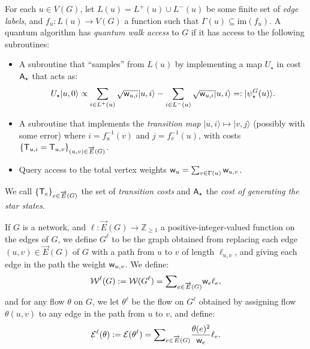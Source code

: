\documentclass{article}
\def\ket#1{{\lvert}#1\rangle}
\renewcommand{\>}{\rangle}
\newcommand{\<}{\langle}
\renewcommand{\(}{\left(}
\renewcommand{\)}{\right)}
\def\w{{\sf w}}
\begin{document}
\begin{definition}\label{def:QW-access}
For each $u\in V(G)$, let $L(u)=L^+(u)\cup L^-(u)$ be some finite set of \emph{edge labels}, and $f_u:L(u)\rightarrow V(G)$ a function such that $\Gamma(u)\subseteq \mathrm{im}(f_u)$. 
A quantum algorithm has \emph{quantum walk access} to $G$ if it has access to the following subroutines:
\begin{itemize}
\item A subroutine that ``samples'' from $L(u)$ by implementing a map $U_\star$ in cost ${\sf A}_\star$ that acts as:
\begin{equation*}
U_\star\ket{u,0} \propto \sum_{i\in L^+(u)}\sqrt{\w_{u,i}}\ket{u,i}-\sum_{i\in L^-(u)}\sqrt{\w_{u,i}}\ket{u,i} =: \ket{\psi_\star^G(u)}.
\end{equation*}
\item A subroutine that implements the \emph{transition map}
$
\ket{u,i}\mapsto \ket{v,j}
$
(possibly with some error) where $i=f^{-1}_u(v)$ and $j=f^{-1}_v(u)$, with costs $\{{\sf T}_{u,i}={\sf T}_{u,v}\}_{(u,v)\in\overrightarrow{E}(G)}$. 

\item Query access to the total vertex weights $\w_u=\sum_{v\in\Gamma(u)}\w_{u,v}$. 
\end{itemize}
We call $\{{\sf T}_e\}_{e\in\overrightarrow{E}(G)}$ the set of \emph{transition costs} and ${\sf A}_\star$ the \emph{cost of generating the star states}. 
\end{definition}





\begin{definition}\label{def:nwk-length}
If $G$ is a network, and $\ell:\overrightarrow{E}(G)\rightarrow\mathbb{Z}_{\geq 1}$ a positive-integer-valued function on the edges of $G$, we define $G^{\ell}$ to be the graph obtained from replacing each edge $(u,v)\in \overrightarrow{E}(G)$ of $G$ with a path from $u$ to $v$ of length $\ell_{u,v}$, and giving each edge in the path the weight $\w_{u,v}$. We define:
\begin{equation*}
{\cal W}^{\ell}(G):={\cal W}(G^\ell)=\textstyle{\displaystyle\sum}_{e\in \overrightarrow{E}(G)}\w_e\ell_e,
\end{equation*}
and for any flow $\theta$ on $G$, we let $\theta^{\ell}$ be the flow on $G^{\ell}$ obtained by assigning flow $\theta(u,v)$ to any edge in the path from $u$ to $v$, and define:
\begin{equation*}
{\cal E}^{\ell}(\theta):={\cal E}(\theta^{\ell})=\textstyle{\displaystyle\sum}_{e\in \overrightarrow{E}(G)}\displaystyle\frac{\theta(e)^2}{\w_e}\ell_e.
\end{equation*}
\end{definition}
\end{document}
